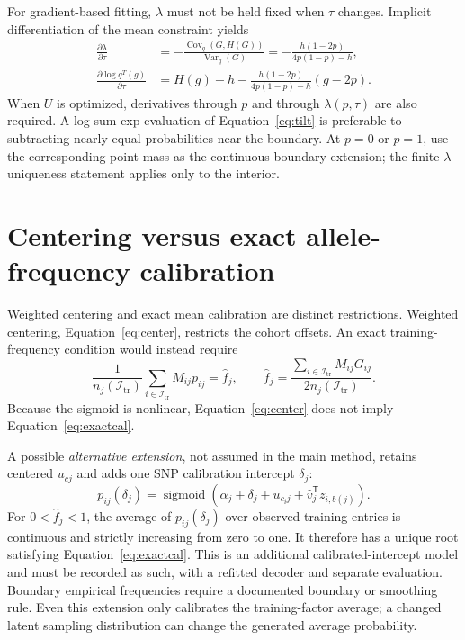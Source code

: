 \documentclass[11pt,a4paper]{article}
\newcommand{\Var}{\operatorname{Var}}
\newcommand{\Cov}{\operatorname{Cov}}
\newcommand{\sigmoid}{\operatorname{sigmoid}}
\newcommand{\tr}{\mathrm{tr}}
\begin{document}
For gradient-based fitting, $\lambda$ must not be held fixed when
$\tau$ changes. Implicit differentiation of the mean constraint yields
\begin{align}
 \frac{\partial\lambda}{\partial\tau}
  &=-\frac{\Cov_q(G,H(G))}{\Var_q(G)}
   =-\frac{h(1-2p)}{4p(1-p)-h},\\
 \frac{\partial\log q^T(g)}{\partial\tau}
  &=H(g)-h-
       \frac{h(1-2p)}{4p(1-p)-h}(g-2p).
 \label{eq:gradient}
\end{align}
When $U$ is optimized, derivatives through $p$ and through $\lambda(p,\tau)$
are also required. A log-sum-exp evaluation of Equation~\eqref{eq:tilt}
is preferable to subtracting nearly equal probabilities near the boundary.
At $p=0$ or $p=1$, use the corresponding point mass as the continuous boundary
extension; the finite-$\lambda$ uniqueness statement applies only to the
interior.

\section{Centering versus exact allele-frequency calibration}
\label{app:calibration}

Weighted centering and exact mean calibration are distinct restrictions.
Weighted centering, Equation~\eqref{eq:center}, restricts the cohort offsets.
An exact training-frequency condition would instead require
\begin{equation}
 \frac{1}{n_j(\mathcal I_{\tr})}
 \sum_{i\in\mathcal I_{\tr}}M_{ij}p_{ij}
 =\widehat f_j,
 \qquad
 \widehat f_j=
 \frac{\sum_{i\in\mathcal I_{\tr}}M_{ij}G_{ij}}
      {2n_j(\mathcal I_{\tr})}.
 \label{eq:exactcal}
\end{equation}
Because the sigmoid is nonlinear, Equation~\eqref{eq:center} does not imply
Equation~\eqref{eq:exactcal}.

A possible \emph{alternative extension}, not assumed in the main method,
retains centered $u_{cj}$ and adds one SNP calibration intercept $\delta_j$:
\begin{equation}
 p_{ij}(\delta_j)=\sigmoid\!\left(
   \widehat\alpha_j+\delta_j+u_{c_i j}
        +\widehat v_j^{\mathsf T}z_{i,b(j)}\right).
 \label{eq:deltacal}
\end{equation}
For $0<\widehat f_j<1$, the average of $p_{ij}(\delta_j)$ over observed
training entries is continuous and strictly increasing from zero to one.
It therefore has a unique root satisfying Equation~\eqref{eq:exactcal}.
This is an additional calibrated-intercept model and must be recorded as
such, with a refitted decoder and separate evaluation. Boundary empirical
frequencies require a documented boundary or smoothing rule. Even this
extension only calibrates the training-factor average; a changed latent
sampling distribution can change the generated average probability.
\end{document}

